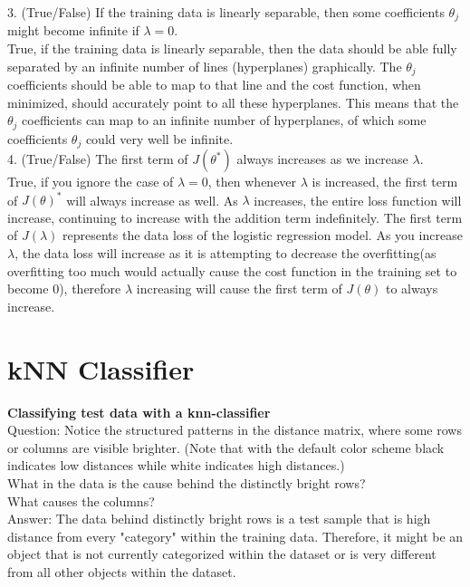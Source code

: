 \documentclass[12pt]{article}
\begin{document}
3. (True/False) If the training data is linearly separable, then some coefficients $\theta_j$ might become infinite if $\lambda = 0$.\\
True, if the training data is linearly separable, then the data should be able fully separated by an infinite number of lines (hyperplanes) graphically. The $\theta_j$ coefficients should be able to map to that line and the cost function, when minimized, should accurately point to all these hyperplanes. This means that the $\theta_j$  coefficients can map to an infinite number of hyperplanes, of which some coefficients $\theta_j$ could very well be infinite.\\

4. (True/False) The first term of $J(\theta^*)$ always increases as we increase $\lambda$.\\
True, if you ignore the case of $\lambda = 0$, then whenever $\lambda$ is increased, the first term of $J(\theta)^*$ will always increase as well. As $\lambda$ increases, the entire loss function will increase, continuing to increase with the addition term indefinitely. The first term of $J(\lambda)$ represents the data loss of the logistic regression model. As you increase $\lambda$, the data loss will increase as it is attempting to decrease the overfitting(as overfitting too much would actually cause the cost function in the training set to become 0), therefore $\lambda$ increasing will cause the first term of $J(\theta)$ to always increase.\\

\section*{kNN Classifier}
\textbf{Classifying test data with a knn-classifier}\\
Question: Notice the structured patterns in the distance matrix, where some rows or columns are visible brighter. (Note that with the default color scheme black indicates low distances while white indicates high distances.)\\

What in the data is the cause behind the distinctly bright rows?\\
What causes the columns?\\
Answer: The data behind distinctly bright rows is a test sample that is high distance from every "category" within the training data. Therefore, it might be an object that is not currently categorized within the dataset or is very different from all other objects within the dataset.\\
\end{document}
